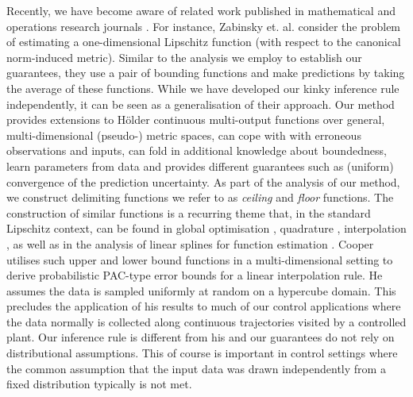 \documentclass{article} %
\theoremstyle{definition}
\theoremstyle{remark}
\begin{document}
Recently, we have become aware of related work published in mathematical and operations research journals \cite{Cooper2006,Cooper1995,Zabinsky2003,Beliakov2006,Beliakovsmoothing2007}. For instance, Zabinsky et. al. \cite{Zabinsky2003} consider the problem of estimating a one-dimensional Lipschitz function (with respect to the canonical norm-induced metric). Similar to the analysis we employ to establish our guarantees, they use a pair of bounding functions and make predictions by taking the average of these functions. While we have developed our kinky inference rule independently, it can be seen as a generalisation of their approach. Our method provides extensions to H\"older continuous multi-output functions over general, multi-dimensional (pseudo-) metric spaces, can cope with with erroneous observations and inputs, can fold in additional knowledge about boundedness, learn parameters from data and provides different guarantees such as (uniform) convergence of the prediction uncertainty. 
As part of the analysis of our method, we construct delimiting functions we refer to as \textit{ceiling} and \textit{floor} functions. The construction of similar functions is a recurring theme that, in the standard Lipschitz context, can be found in global  optimisation \cite{Shubert:72}, quadrature \cite{Baran2008}, interpolation \cite{Beliakov2006,Beliakovsmoothing2007}, as well as in the analysis of linear splines for function estimation \cite{Cooper1995}. Cooper \cite{Cooper2006,Cooper1995} utilises such upper and lower bound functions in a multi-dimensional setting to derive probabilistic PAC-type error bounds \cite{Valiant1984} for a linear interpolation rule. He assumes the data is sampled uniformly at random on a hypercube domain. This precludes the application of his results to much of our control applications where the data normally is collected along continuous trajectories visited by a controlled plant. Our inference rule is different from his and our guarantees do not rely on distributional assumptions. This of course is important in control settings where the common assumption that the input data was drawn independently from a fixed distribution typically is not met.
\end{document}
